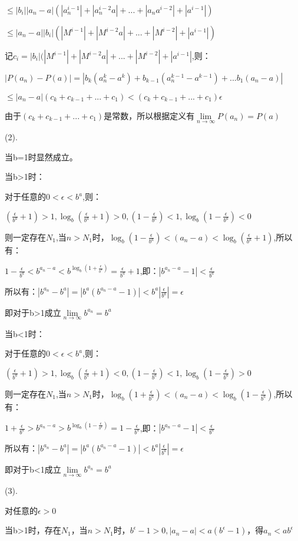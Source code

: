\documentclass[12pt]{ctexart}
\begin{document}
$\le|b_i||a_n-a|(|a_n^{i-1}|+|a_n^{i-2}a|+...+|a_na^{i-2}|+|a^{i-1}|)$

$\le|a_n-a||b_i|(|M^{i-1}|+|M^{i-2}a|+...+|M^{i-2}|+|a^{i-1}|)$

记$c_i=|b_i|(|M^{i-1}|+|M^{i-2}a|+...+|M^{i-2}|+|a^{i-1}|$,则：

$|P(a_n)-P(a)|=|b_k(a_n^k-a^k)+b_{k-1}(a_n^{k-1}-a^{k-1})+...b_1(a_n-a)|$

$\le|a_n-a|(c_k+c_{k-1}+...+c_1)<(c_k+c_{k-1}+...+c_1)\epsilon$

由于$(c_k+c_{k-1}+...+c_1)$是常数，所以根据定义有$\lim\limits_{n\to\infty}P(a_n)=P(a)$

(2).

当b=1时显然成立。

当b>1时：

对于任意的$0<\epsilon<b^a$,则：

$(\frac{\epsilon}{b^a}+1)>1,\log_b{(\frac{\epsilon}{b^a}+1)}>0, (1-\frac{\epsilon}{b^a})<1,\log_b{(1-\frac{\epsilon}{b^a})}<0$

则一定存在$N_1$,当$n>N_1$时，$\log_b{(1-\frac{\epsilon}{b^a})}<(a_n-a)<\log_b{(\frac{\epsilon}{b^a}+1)}$,所以有：

$1-\frac{\epsilon}{b^a}<b^{a_n-a}<b^{\log_b{(1+\frac{\epsilon}{b^a})}}=\frac{\epsilon}{b^a}+1$,即：$|b^{a_n-a}-1|<\frac{\epsilon}{b^a}$

所以有：$|b^{a_n}-b^a|=|b^a(b^{a_n-a}-1)|<b^a|\frac{\epsilon}{b^a}|=\epsilon$

即对于b>1成立$\lim\limits_{n\to\infty}b^{a_n}=b^a$

当b<1时：

对于任意的$0<\epsilon<b^a$,则：

$(\frac{\epsilon}{b^a}+1)>1,\log_b{(\frac{\epsilon}{b^a}+1)}<0, (1-\frac{\epsilon}{b^a})<1,\log_b{(1-\frac{\epsilon}{b^a})}>0$

则一定存在$N_1$,当$n>N_1$时，$\log_b{(1+\frac{\epsilon}{b^a})}<(a_n-a)<\log_b{(1-\frac{\epsilon}{b^a})}$,所以有：

$1+\frac{\epsilon}{b^a}>b^{a_n-a}>b^{\log_b{(1-\frac{\epsilon}{b^a})}}=1-\frac{\epsilon}{b^a}$,即：$|b^{a_n-a}-1|<\frac{\epsilon}{b^a}$

所以有：$|b^{a_n}-b^a|=|b^a(b^{a_n-a}-1)|<b^a|\frac{\epsilon}{b^a}|=\epsilon$

即对于b<1成立$\lim\limits_{n\to\infty}b^{a_n}=b^a$

(3).

对任意的$\epsilon>0$

当b>1时，存在$N_1$，当$n>N_1$时，$b^{\epsilon}-1>0,|a_n-a|<a(b^{\epsilon}-1)$，得$a_n<ab^{\epsilon}$
\end{document}
